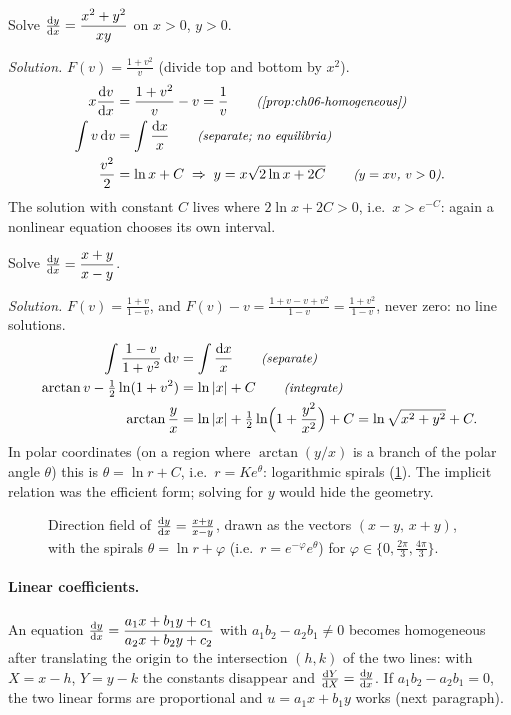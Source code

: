\begin{example}\label{ex:ch06-homog1}
Solve $\frac{\mathrm{d}y}{\mathrm{d}x} = \dfrac{x^2 + y^2}{xy}$ on $x>0$, $y>0$.

\emph{Solution.} $F(v) = \frac{1 + v^2}{v}$ (divide top and bottom by $x^2$).
\begin{align*}
  x\der{v}{x} &= \frac{1 + v^2}{v} - v = \frac1v \why{\cref{prop:ch06-homogeneous}}\\
  \int v\,\mathrm{d}v &= \int\frac{\mathrm{d}x}{x} \why{separate; no equilibria}\\
  \frac{v^2}{2} &= \ln x + C\;\Rightarrow\; y = x\sqrt{2\ln x + 2C}
     \why{$y = xv$, $v>0$}.
\end{align*}
The solution with constant $C$ lives where $2\ln x + 2C>0$, i.e.\ $x>e^{-C}$:
again a nonlinear equation chooses its own interval.
\end{example}

\begin{example}\label{ex:ch06-spiral}
Solve $\frac{\mathrm{d}y}{\mathrm{d}x} = \dfrac{x + y}{x - y}$.

\emph{Solution.} $F(v) = \frac{1+v}{1-v}$, and
$F(v) - v = \frac{1 + v - v + v^2}{1 - v} = \frac{1 + v^2}{1-v}$, never zero:
no line solutions.
\begin{align*}
  \int\frac{1 - v}{1 + v^2}\,\mathrm{d}v &= \int\frac{\mathrm{d}x}{x} \qquad\text{\small\itshape(separate)}\\
  \arctan v - \tfrac12\ln(1 + v^2) &= \ln|x| + C \qquad\text{\small\itshape(integrate)}\\
  \arctan\frac yx &= \ln|x| + \tfrac12\ln\Bigl(1 + \frac{y^2}{x^2}\Bigr) + C
     = \ln\sqrt{x^2+y^2} + C .
\end{align*}
In polar coordinates (on a region where $\arctan(y/x)$ is a branch of the
polar angle $\theta$) this is $\theta = \ln r + C$, i.e.\ $r = Ke^{\theta}$:
logarithmic spirals (\cref{fig:ch06-spiral}). The implicit relation was
the efficient form; solving for $y$ would hide the geometry.
\end{example}

\begin{figure}[ht]
  \centering
  
  \caption{Direction field of $\frac{\mathrm{d}y}{\mathrm{d}x} = \frac{x+y}{x-y}$, drawn as the
  vectors $(x - y,\,x + y)$, with the spirals $\theta = \ln r + \varphi$
  (i.e.\ $r = e^{-\varphi}e^{\theta}$) for $\varphi\in\{0,\frac{2\pi}3,\frac{4\pi}3\}$.}
  \label{fig:ch06-spiral}
\end{figure}

\paragraph{Linear coefficients.} An equation
$\frac{\mathrm{d}y}{\mathrm{d}x} = \dfrac{a_1x + b_1y + c_1}{a_2x + b_2y + c_2}$ with
$a_1b_2 - a_2b_1\neq0$ becomes homogeneous after translating the origin to the
intersection $(h,k)$ of the two lines: with $X = x - h$, $Y = y - k$ the
constants disappear and $\frac{\mathrm{d}Y}{\mathrm{d}X} = \frac{\mathrm{d}y}{\mathrm{d}x}$. If $a_1b_2 - a_2b_1 = 0$, the
two linear forms are proportional and $u = a_1x + b_1y$ works (next paragraph).

